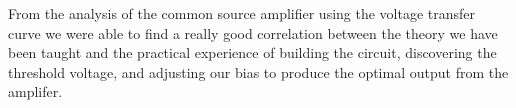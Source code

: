 
From the analysis of the common source amplifier using the voltage transfer curve we were able to find a really good correlation between the theory we have been taught and the practical experience of building the circuit, discovering the threshold voltage, and adjusting our bias to produce the optimal output from the amplifer.

